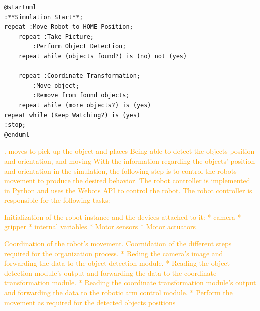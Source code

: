 \begin{lstlisting}[]%language=plantuml
@startuml
:**Simulation Start**;
repeat :Move Robot to HOME Position;
    repeat :Take Picture;
        :Perform Object Detection;
    repeat while (objects found?) is (no) not (yes)

    repeat :Coordinate Transformation;
        :Move object;
        :Remove from found objects;
    repeat while (more objects?) is (yes)
repeat while (Keep Watching?) is (yes)
:stop;
@enduml
\end{lstlisting}

\textcolor{orange}{
. moves to pick up the object and places  
Being able to detect the objects position and orientation, and moving 
With the information regarding the objects' position and orientation in the simulation, the following step is to control the robots movement to produce the desired behavior. The robot controller is implemented in Python and uses the Webots API to control the robot. The robot controller is responsible for the following tasks:
}

\textcolor{orange}{
Initialization of the robot instance and the devices attached to it: 
* camera
* gripper
* internal variables
* Motor sensors
* Motor actuators
}

\textcolor{orange}{
Coordination of the robot's movement.
Coornidation of the different steps required for the organization process.
* Reding the camera's image and forwarding the data to the object detection module.
* Reading the object detection module's output and forwarding the data to the coordinate transformation module.
* Reading the coordinate transformation module's output and forwarding the data to the robotic arm control module.
* Perform the movement as required for the detected objects positions
} %

